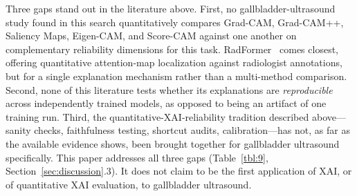 Three gaps stand out in the literature above. First, no gallbladder-ultrasound study found in this search quantitatively compares Grad-CAM, Grad-CAM++, Saliency Maps, Eigen-CAM, and Score-CAM against one another on complementary reliability dimensions for this task. RadFormer~\cite{ref19} comes closest, offering quantitative attention-map localization against radiologist annotations, but for a single explanation mechanism rather than a multi-method comparison. Second, none of this literature tests whether its explanations are \textit{reproducible} across independently trained models, as opposed to being an artifact of one training run. Third, the quantitative-XAI-reliability tradition described above---sanity checks, faithfulness testing, shortcut audits, calibration---has not, as far as the available evidence shows, been brought together for gallbladder ultrasound specifically. This paper addresses all three gaps (Table~\ref{tbl:9}, Section~\ref{sec:discussion}.3). It does not claim to be the first application of XAI, or of quantitative XAI evaluation, to gallbladder ultrasound.
